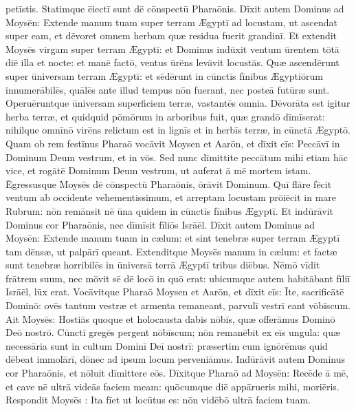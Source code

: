 petīstis. Statimque ēiectī sunt dē cōnspectū Pharaōnis.  Dīxit autem
Dominus ad Moysēn: Extende manum tuam super terram Ægyptī ad locustam, ut
ascendat super eam, et dēvoret omnem herbam quæ residua
fuerit grandinī.  Et extendit Moysēs virgam super terram Ægyptī: et
Dominus indūxit ventum ūrentem tōtā diē illa et nocte: et manē factō,
ventus ūrēns levāvit locustās.  Quæ ascendērunt super
ūniversam terram Ægyptī: et sēdērunt in cūnctīs fīnibus Ægyptiōrum
innumerābilēs, quālēs ante illud tempus nōn fuerant, nec
posteā futūræ sunt.  Operuēruntque ūniversam superficiem terræ,
vastantēs omnia. Dēvorāta est igitur herba terræ, et
quidquid pōmōrum in arboribus fuit, quæ grandō dīmīserat:
nihilque omnīnō virēns relictum est in lignīs et
in herbīs terræ, in cūnctā Ægyptō.  Quam ob rem festīnus
Pharaō vocāvit Moysen et Aarōn, et dīxit eīs: Peccāvī in Dominum Deum vestrum, et in vōs.  Sed nunc
dīmittite peccātum mihi etiam hāc vice, et rogātē Dominum Deum vestrum, ut
auferat ā mē mortem istam.  Ēgressusque Moysēs dē cōnspectū Pharaōnis,
ōrāvit Dominum.  Quī flāre fēcit ventum ab occidente
vehementissimum, et arreptam locustam
prōiēcit in mare Rubrum: nōn remānsit nē ūna quidem in cūnctīs fīnibus
Ægyptī.  Et indūrāvit Dominus cor Pharaōnis, nec dīmīsit fīliōs
Isrāēl.  Dīxit autem Dominus ad Moysēn: Extende manum
tuam in cælum: et sint tenebræ super terram Ægyptī tam
dēnsæ, ut palpārī queant.  Extenditque
Moysēs manum in cælum: et factæ sunt tenebræ horribilēs in
ūniversā terrā Ægyptī tribus diēbus.  Nēmō vīdit frātrem suum, nec mōvit
sē dē locō in quō erat: ubicumque autem habitābant fīliī
Isrāēl, lūx erat.  Vocāvitque Pharaō Moysen et Aarōn, et dīxit eīs: Īte,
sacrificātē Dominō: ovēs tantum vestræ et armenta
remaneant, parvulī vestrī eant vōbīscum.  Ait Moysēs: Hostiās quoque et
holocausta dabis nōbīs, quæ offerāmus Dominō Deō nostrō. 
Cūnctī gregēs pergent nōbīscum; nōn remanēbit ex eīs
ungula: quæ necessāria sunt in cultum Dominī Deī nostrī:
præsertim cum ignōrēmus quid dēbeat
immolārī, dōnec ad ipsum locum
perveniāmus.  Indūrāvit autem Dominus cor Pharaōnis, et nōluit dīmittere
eōs.  Dīxitque Pharaō ad Moysēn: Recēde ā mē, et cave nē ultrā videās
faciem meam: quōcumque diē appārueris mihi, moriēris.  Respondit Moysēs
: Ita fīet ut locūtus es: nōn vidēbō ultrā faciem tuam. 
